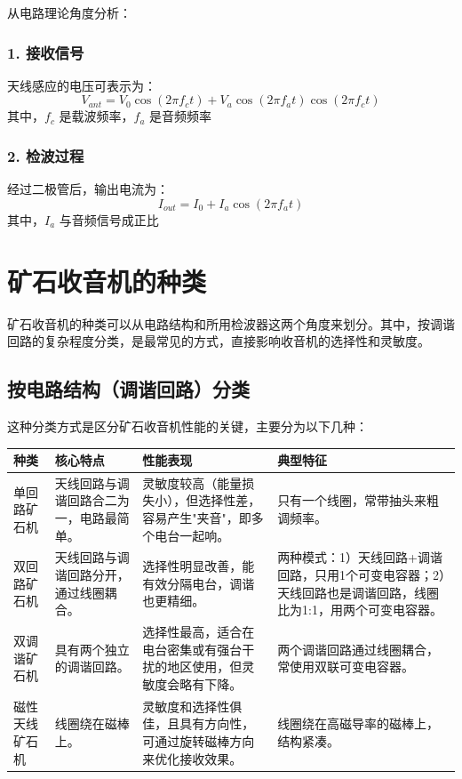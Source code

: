 \documentclass[12pt,UTF8]{ctexbook}
\begin{document}
从电路理论角度分析：

\subsubsection{1. 接收信号}
天线感应的电压可表示为：
   \[ V_{ant} = V_0 \cos(2\pi f_c t) + V_a \cos(2\pi f_a t) \cos(2\pi f_c t) \]
   其中，\( f_c \) 是载波频率，\( f_a \) 是音频频率

\subsubsection{2. 检波过程}
经过二极管后，输出电流为：
   \[ I_{out} = I_0 + I_a \cos(2\pi f_a t) \]
   其中，\( I_a \) 与音频信号成正比

\section{矿石收音机的种类}

矿石收音机的种类可以从电路结构和所用检波器这两个角度来划分。其中，按调谐回路的复杂程度分类，是最常见的方式，直接影响收音机的选择性和灵敏度。

\subsection{按电路结构（调谐回路）分类}

这种分类方式是区分矿石收音机性能的关键，主要分为以下几种：

\begin{tabular}{|l|l|l|l|}
	\hline
	\textbf{种类} & \textbf{核心特点} & \textbf{性能表现} & \textbf{典型特征} \\
	\hline
	单回路矿石机 & 天线回路与调谐回路合二为一，电路最简单。 & 灵敏度较高（能量损失小），但选择性差，容易产生"夹音"，即多个电台一起响。 & 只有一个线圈，常带抽头来粗调频率。 \\
	\hline
	双回路矿石机 & 天线回路与调谐回路分开，通过线圈耦合。 & 选择性明显改善，能有效分隔电台，调谐也更精细。 & 两种模式：1）天线回路+调谐回路，只用1个可变电容器；2）天线回路也是调谐回路，线圈比为1:1，用两个可变电容器。 \\
	\hline
	双调谐矿石机 & 具有两个独立的调谐回路。 & 选择性最高，适合在电台密集或有强台干扰的地区使用，但灵敏度会略有下降。 & 两个调谐回路通过线圈耦合，常使用双联可变电容器。 \\
	\hline
	磁性天线矿石机 & 线圈绕在磁棒上。 & 灵敏度和选择性俱佳，且具有方向性，可通过旋转磁棒方向来优化接收效果。 & 线圈绕在高磁导率的磁棒上，结构紧凑。 \\
	\hline
\end{tabular}
\end{document}
